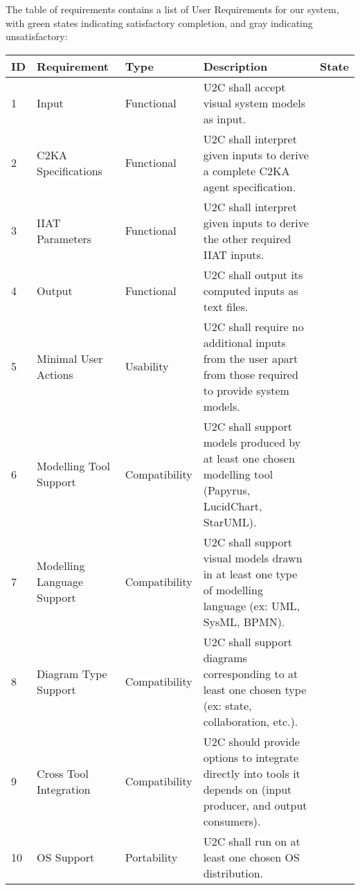 \documentclass[11pt]{article}
\begin{document}
    The table of requirements contains a list of User Requirements for our system,
    with green states indicating satisfactory completion, and gray indicating unsatisfactory:
    \begin{longtable}{|l|p{2.6cm}|l|p{4.5cm}|c|}
        \hline
        \textbf{ID} & \textbf{Requirement} & \textbf{Type}  & \textbf{Description} & \textbf{State}\\
        \hline
        \endhead
        \hline
        1 & Input & Functional & U2C shall accept visual system models as input. & \cellcolor{green!30}  \\
        \hline
        2 & C2KA Specifications & Functional & U2C shall interpret given inputs to derive a complete C2KA agent specification. & \cellcolor{green!30}  \\
        \hline
        3 & IIAT Parameters & Functional & U2C shall interpret given inputs to derive the other required IIAT inputs. & \cellcolor{gray!30}  \\
        \hline
        4 & Output & Functional & U2C shall output its computed inputs as text files. & \cellcolor{green!30}  \\
        \hline
        5 & Minimal User Actions & Usability & U2C shall require no additional inputs from the user apart from those required to provide system models. & \cellcolor{green!30}  \\
        \hline
        6 & Modelling Tool Support & Compatibility & U2C shall support models produced by at least one chosen modelling tool (Papyrus, LucidChart, StarUML). & \cellcolor{green!30}  \\
        \hline
        7 & Modelling Language Support & Compatibility & U2C shall support visual models drawn in at least one type of modelling language (ex: UML, SysML, BPMN). & \cellcolor{green!30}  \\
        \hline
        8 & Diagram Type Support & Compatibility & U2C shall support diagrams corresponding to at least one chosen type (ex: state, collaboration, etc.). & \cellcolor{green!30}  \\
        \hline
        9 & Cross Tool Integration & Compatibility & U2C should provide options to integrate directly into tools it depends on (input producer, and output consumers). & \cellcolor{gray!30}  \\
        \hline
        10 & OS Support & Portability & U2C shall run on at least one chosen OS distribution. & \cellcolor{green!30}  \\

\end{longtable}
\end{document}
